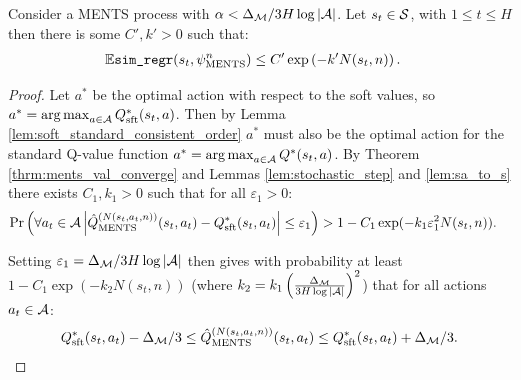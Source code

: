     \begin{lemma} \label{lem:ments_imm_simple_regret}
        Consider a MENTS process with $\alpha<\Delta_{\mathcal{M}}/3H\log |\mathcal{A}|$. Let $s_t\in\mathcal{S}$, with $1\leq t \leq H$ then there is some $C',k'>0$ such that:
        \begin{align}
            \mathbb{E} {\textnormal{\texttt{sim\_regr}}}(s_{t},\psi^{n}_{{\textnormal{MENTS}}}) &\leq C'\exp\left( -k' N(s_{t},n) \right).
        \end{align}
    \end{lemma}
    \begin{proof}

        Let $a^*$ be the optimal action with respect to the soft values, so $a^*=\operatorname*{arg\,max}_{a\in\mathcal{A}} Q_{{\textnormal{sft}}}^*(s_t,a)$. Then by Lemma \ref{lem:soft_standard_consistent_order} $a^*$ must also be the optimal action for the standard Q-value function $a^*=\operatorname*{arg\,max}_{a\in\mathcal{A}} Q^*(s_t,a)$. By Theorem \ref{thrm:ments_val_converge} and Lemmas \ref{lem:stochastic_step} and \ref{lem:sa_to_s} there exists $C_1,k_1>0$ such that for all $\varepsilon_1>0$: 
        \begin{align}
            \Pr\left(\forall a_t\in\mathcal{A} \left|{\hat{Q}^{(N(s_t,a_t,n))}_{{\textnormal{MENTS}}}}(s_t,a_t)-Q_{{\textnormal{sft}}}^*(s_t,a_t)\right|\leq \varepsilon_1\right) &> 1-C_1 \exp(-k_1 \varepsilon_1^2 N(s_t,n)).
        \end{align}
        
        Setting $\varepsilon_1=\Delta_{\mathcal{M}}/3H\log |\mathcal{A}|$ then gives with probability at least $1-C_1 \exp(-k_2N(s_t,n))$ (where $k_2=k_1\left(\frac{\Delta_{\mathcal{M}}}{3H\log|\mathcal{A}|}\right)^2$) that for all actions $a_t\in\mathcal{A}$:
        \begin{align}
            Q_{{\textnormal{sft}}}^*(s_t,a_t) - \Delta_{\mathcal{M}}/3 \leq {\hat{Q}^{(N(s_t,a_t,n))}_{{\textnormal{MENTS}}}}(s_t,a_t) \leq Q_{{\textnormal{sft}}}^*(s_t,a_t) + \Delta_{\mathcal{M}}/3.
        \end{align}
        

\end{proof}
